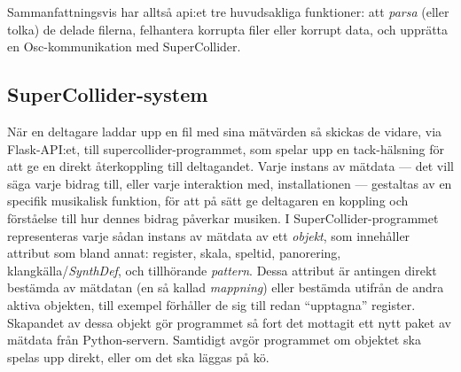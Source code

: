\documentclass[11pt, a4paper]{article} %
\begin{document}
Sammanfattningsvis har alltså \gls{api}:et tre huvudsakliga funktioner: att \emph{parsa} (eller tolka) de delade filerna, felhantera korrupta filer eller korrupt data, och upprätta en Osc-kommunikation med SuperCollider.


\subsection*{SuperCollider-system}
När en deltagare laddar upp en fil med sina mätvärden så skickas de vidare, via Flask-API:et, till \gls{supercollider}-programmet, som spelar upp en tack-hälsning för att ge en direkt återkoppling till deltagandet. Varje instans av mätdata --- det vill säga varje bidrag till, eller varje interaktion med, installationen --- gestaltas av en specifik musikalisk funktion, för att på sätt ge deltagaren en koppling och förståelse till hur dennes bidrag påverkar musiken. 
I SuperCollider-programmet representeras varje sådan instans av mätdata av ett \emph{objekt}, som innehåller attribut som bland annat: register, skala, speltid, panorering, klangkälla/\emph{SynthDef}, och tillhörande \emph{\gls{pattern}}. Dessa attribut är antingen direkt bestämda av mätdatan (en så kallad \emph{mappning}) eller bestämda utifrån de andra aktiva objekten, till exempel förhåller de sig till redan ``upptagna'' register. Skapandet av dessa objekt gör programmet så fort det mottagit ett nytt paket av mätdata från Python-servern. Samtidigt avgör programmet om objektet ska spelas upp direkt, eller om det ska läggas på kö. 
\end{document}
